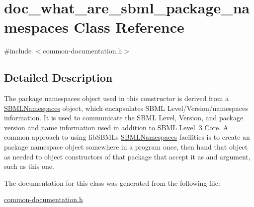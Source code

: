\hypertarget{classdoc__what__are__sbml__package__namespaces}{}\section{doc\+\_\+what\+\_\+are\+\_\+sbml\+\_\+package\+\_\+namespaces Class Reference}
\label{classdoc__what__are__sbml__package__namespaces}


{\ttfamily \#include $<$common-\/documentation.\+h$>$}



\subsection{Detailed Description}
\begin{DoxyParagraph}{}
The package namespaces object used in this constructor is derived from a \hyperlink{class_s_b_m_l_namespaces}{S\+B\+M\+L\+Namespaces} object, which encapsulates S\+B\+ML Level/\+Version/namespaces information. It is used to communicate the S\+B\+ML Level, Version, and package version and name information used in addition to S\+B\+ML Level~3 Core. A common approach to using lib\+S\+B\+ML\textquotesingle{}s \hyperlink{class_s_b_m_l_namespaces}{S\+B\+M\+L\+Namespaces} facilities is to create an package namespace object somewhere in a program once, then hand that object as needed to object constructors of that package that accept it as and argument, such as this one. 
\end{DoxyParagraph}


The documentation for this class was generated from the following file\+:\begin{DoxyCompactItemize}
\item 
\hyperlink{common-documentation_8h}{common-\/documentation.\+h}\end{DoxyCompactItemize}
